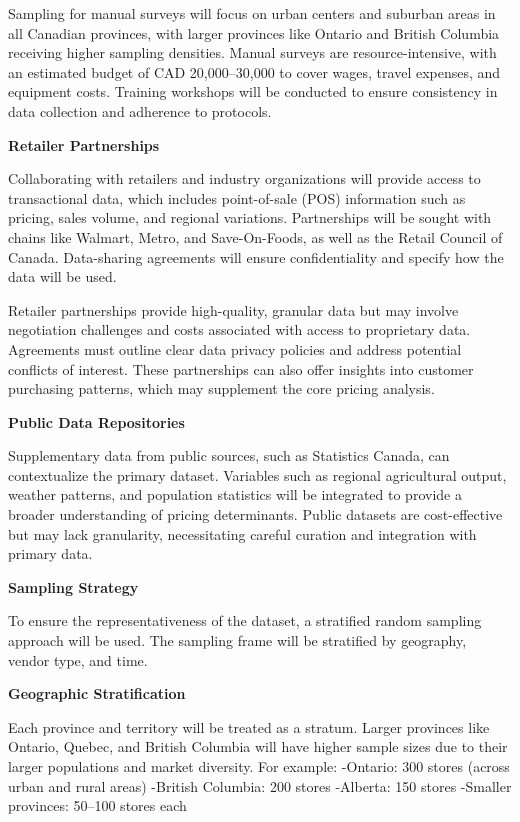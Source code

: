 \documentclass[
  letterpaper,
  DIV=11,
  numbers=noendperiod]{scrartcl}
\begin{document}
Sampling for manual surveys will focus on urban centers and suburban
areas in all Canadian provinces, with larger provinces like Ontario and
British Columbia receiving higher sampling densities. Manual surveys are
resource-intensive, with an estimated budget of CAD 20,000--30,000 to
cover wages, travel expenses, and equipment costs. Training workshops
will be conducted to ensure consistency in data collection and adherence
to protocols.

\textbf{Retailer Partnerships}

Collaborating with retailers and industry organizations will provide
access to transactional data, which includes point-of-sale (POS)
information such as pricing, sales volume, and regional variations.
Partnerships will be sought with chains like Walmart, Metro, and
Save-On-Foods, as well as the Retail Council of Canada. Data-sharing
agreements will ensure confidentiality and specify how the data will be
used.

Retailer partnerships provide high-quality, granular data but may
involve negotiation challenges and costs associated with access to
proprietary data. Agreements must outline clear data privacy policies
and address potential conflicts of interest. These partnerships can also
offer insights into customer purchasing patterns, which may supplement
the core pricing analysis.

\textbf{Public Data Repositories}

Supplementary data from public sources, such as Statistics Canada, can
contextualize the primary dataset. Variables such as regional
agricultural output, weather patterns, and population statistics will be
integrated to provide a broader understanding of pricing determinants.
Public datasets are cost-effective but may lack granularity,
necessitating careful curation and integration with primary data.

\textbf{Sampling Strategy}

To ensure the representativeness of the dataset, a stratified random
sampling approach will be used. The sampling frame will be stratified by
geography, vendor type, and time.

\textbf{Geographic Stratification}

Each province and territory will be treated as a stratum. Larger
provinces like Ontario, Quebec, and British Columbia will have higher
sample sizes due to their larger populations and market diversity. For
example: -Ontario: 300 stores (across urban and rural areas) -British
Columbia: 200 stores -Alberta: 150 stores -Smaller provinces: 50--100
stores each
\end{document}
